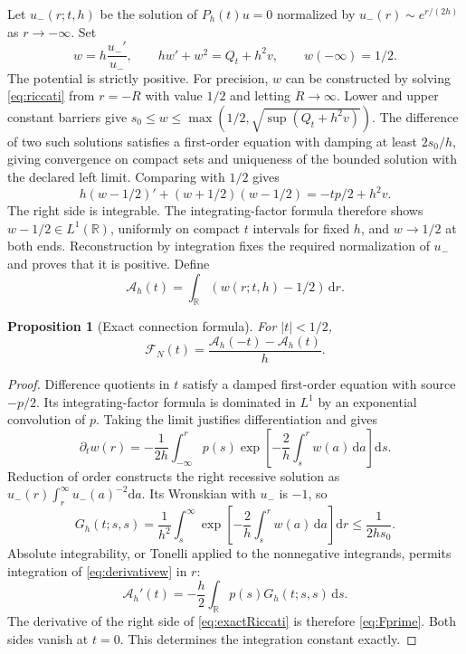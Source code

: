 \documentclass[10pt]{article}
\newtheorem{proposition}[theorem]{Proposition}
\newcommand{\dd}{\mathrm d}
\newcommand{\RR}{\mathbb R}
\begin{document}
Let $u_-(r;t,h)$ be the solution of $P_h(t)u=0$ normalized by
$u_-(r)\sim e^{r/(2h)}$ as $r\to-\infty$. Set
\begin{equation}
w=h\frac{u_-'}{u_-},\qquad
hw'+w^2=Q_t+h^2v,\qquad w(-\infty)=1/2.
\label{eq:riccati}
\end{equation}
The potential is strictly positive. For precision, $w$ can be
constructed by solving \eqref{eq:riccati} from $r=-R$ with value
$1/2$ and letting $R\to\infty$. Lower and upper constant barriers
give $s_0\le w\le\max(1/2,\sqrt{\sup(Q_t+h^2v)})$.
The difference of two such solutions satisfies a first-order
equation with damping at least $2s_0/h$, giving convergence on
compact sets and uniqueness of the bounded solution with the
declared left limit. Comparing with $1/2$ gives
\begin{equation}
h(w-1/2)'+(w+1/2)(w-1/2)=-tp/2+h^2v.
\label{eq:integrable}
\end{equation}
The right side is integrable. The integrating-factor formula
therefore shows $w-1/2\in L^1(\RR)$, uniformly on compact $t$
intervals for fixed $h$, and $w\to1/2$ at both ends.
Reconstruction by integration fixes the required normalization of
$u_-$ and proves that it is positive. Define
\begin{equation}
\mathcal A_h(t)=\int_{\RR}(w(r;t,h)-1/2)\,\dd r.
\label{eq:A}
\end{equation}

\begin{proposition}[Exact connection formula]\label{prop:exact}
For $|t|<1/2$,
\begin{equation}
\boxed{\quad\mathcal F_N(t)=
\frac{\mathcal A_h(-t)-\mathcal A_h(t)}h.\quad}
\label{eq:exactRiccati}
\end{equation}
\end{proposition}
\begin{proof}
Difference quotients in $t$ satisfy a damped first-order equation
with source $-p/2$. Its integrating-factor formula is dominated
in $L^1$ by an exponential convolution of $p$.
Taking the limit justifies differentiation and gives
\begin{equation}
\partial_t w(r)=-\frac1{2h}\int_{-\infty}^r p(s)
 \exp\!\left[-\frac2h\int_s^r w(a)\,\dd a\right]\dd s.
\label{eq:derivativew}
\end{equation}
Reduction of order constructs the right recessive solution as
$u_-(r)\int_r^\infty u_-(a)^{-2}\dd a$. Its Wronskian with
$u_-$ is $-1$, so
\begin{equation}
G_h(t;s,s)=\frac1{h^2}\int_s^\infty
 \exp\!\left[-\frac2h\int_s^r w(a)\,\dd a\right]\dd r
\le\frac1{2hs_0}.
\label{eq:green}
\end{equation}
Absolute integrability, or Tonelli applied to the nonnegative
integrands, permits integration of \eqref{eq:derivativew} in $r$:
\[
\mathcal A_h'(t)=-\frac h2\int_{\RR}p(s)G_h(t;s,s)\,\dd s.
\]
The derivative of the right side of \eqref{eq:exactRiccati} is
therefore \eqref{eq:Fprime}. Both sides vanish at $t=0$.
This determines the integration constant exactly.
\end{proof}
\end{document}
